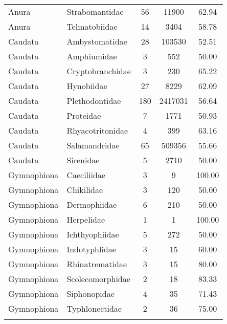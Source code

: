 \begin{longtable}{llccc}
  Anura & Strabomantidae &  56 & 11900 & 62.94 \\ 
  Anura & Telmatobiidae &  14 & 3404 & 58.78 \\ 
  Caudata & Ambystomatidae &  28 & 103530 & 52.51 \\ 
  Caudata & Amphiumidae &   3 & 552 & 50.00 \\ 
  Caudata & Cryptobranchidae &   3 & 230 & 65.22 \\ 
  Caudata & Hynobiidae &  27 & 8229 & 62.09 \\ 
  Caudata & Plethodontidae & 180 & 2417031 & 56.64 \\ 
  Caudata & Proteidae &   7 & 1771 & 50.93 \\ 
  Caudata & Rhyacotritonidae &   4 & 399 & 63.16 \\ 
  Caudata & Salamandridae &  65 & 509356 & 55.66 \\ 
  Caudata & Sirenidae &   5 & 2710 & 50.00 \\ 
  Gymnophiona & Caeciliidae &   3 &   9 & 100.00 \\ 
  Gymnophiona & Chikilidae &   3 & 120 & 50.00 \\ 
  Gymnophiona & Dermophiidae &   6 & 210 & 50.00 \\ 
  Gymnophiona & Herpelidae &   1 &   1 & 100.00 \\ 
  Gymnophiona & Ichthyophiidae &   5 & 272 & 50.00 \\ 
  Gymnophiona & Indotyphlidae &   3 &  15 & 60.00 \\ 
  Gymnophiona & Rhinatrematidae &   3 &  15 & 80.00 \\ 
  Gymnophiona & Scolecomorphidae &   2 &  18 & 83.33 \\ 
  Gymnophiona & Siphonopidae &   4 &  35 & 71.43 \\ 
  Gymnophiona & Typhlonectidae &   2 &  36 & 75.00 \\ 
   \hline
\hline
\label{table-family_amphibians}
\end{longtable}
